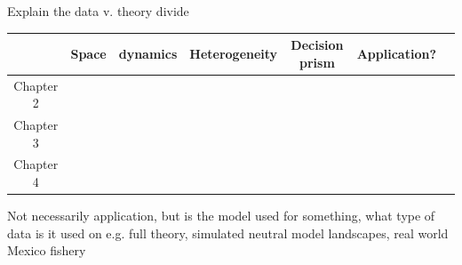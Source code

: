 Explain the data v. theory divide



\begin{table}[H]
\centering

\begin{tabular}{|c|c|c|c|c|c|c}
 & \textbf{Space} & \textbf{dynamics} & Heterogeneity & Decision prism & Application?\\
\hline
Chapter 2      & & & & &\\
\hline
Chapter 3      & & & & &\\
\hline
Chapter 4      & & & & &\\   
\hline
\end{tabular}
\end{table}
Not necessarily application, but is the model used for something, what type of data is it used on e.g. full theory, simulated neutral model landscapes, real world Mexico fishery




